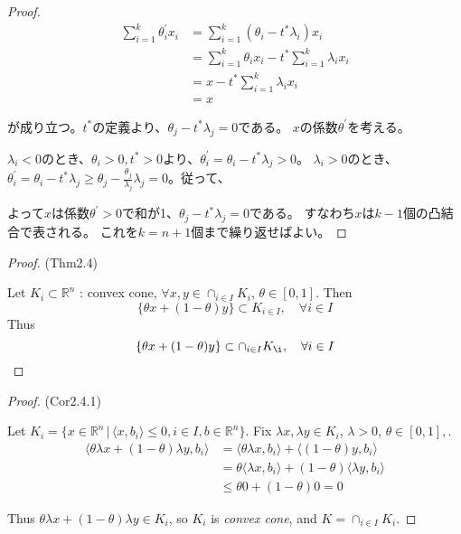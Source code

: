 \documentclass[12pt]{jsarticle}
\begin{document}
\begin{proof}
\begin{align*}
 \sum \limits_{i=1}^{k} \theta_i^{\prime} x_i  &=  \sum \limits_{i=1}^{k} (\theta_i - t^*\lambda_i) x_i \\
                                                                          &= \sum \limits_{i=1}^{k} \theta_i x_i - t^* \sum \limits_{i=1}^{k} \lambda_i x_i  \\
                                                                          &= x - t^* \sum \limits_{i=1}^{k} \lambda_i x_i  \\
                                                                          &= x
\end{align*}

が成り立つ。$t^*$の定義より、$\theta_j - t^*\lambda_j = 0$である。
$x$の係数$\theta^{\prime}$を考える。

$\lambda_i < 0$のとき、$\theta_i > 0, t^* > 0$より、$\theta_i^{\prime} = \theta_i - t^* \lambda_j > 0$。 $\lambda_i > 0の$とき、$\theta_i^{\prime} = \theta_i - t^* \lambda_j \ge \theta_j -  \frac{\theta_j}{\lambda_j} \lambda_j = 0$。従って、

よって$x$は係数$\theta^{\prime} > 0$で和が1、$\theta_j - t^*\lambda_j = 0$である。
すなわち$x$は$k-1$個の凸結合で表される。
これを$k = n+1$個まで繰り返せばよい。


\end{proof}




\begin{proof}
(Thm2.4)

Let $K_{i} \subset \mathbb{R}^n$ : convex cone,  $\forall x, y \in \cap_{i \in I} K_{i}$,  $\theta \in [0, 1]$. Then 
 \[
 \{ \theta x + (1 - \theta) y \} \subset K_{i \in I}, \quad \forall i \in I
 \]
Thus 
 \[
 \{ \theta x + (1 - \theta) y \} \subset \cap_{i \in I} K_{\i}, \quad \forall i \in I
 \]

\end{proof}

\begin{proof}
(Cor2.4.1)

Let
$K_i = \{x \in \mathbb{R}^n \, | \, \langle x,  b_i \rangle \le 0,  i \in I , b \in \mathbb{R}^n\}$. 
Fix $\lambda x,  \lambda y \in K_i$,  $\lambda  > 0$, $\theta \in [0,1],$. 
\begin{align*}
\langle {\theta \lambda x + (1 - \theta)  \lambda y}, {b_i} \rangle & = \langle {\theta \lambda x},  {b_i} \rangle + \langle {(1 - \theta) y}, {b_i} \rangle\\
                                                                            & = \theta \langle {\lambda x},  {b_i} \rangle + (1 - \theta) \langle {\lambda y}, {b_i} \rangle\\      
                                                                            & \le \theta 0 + (1 - \theta) 0  = 0  
\end{align*}

Thus $\theta \lambda x + (1 - \theta) \lambda y \in K_i$,  so $K_i$ is \textit{convex cone},  and $K = \cap_{i \in I} K_{i}$.


\end{proof}
\end{document}
